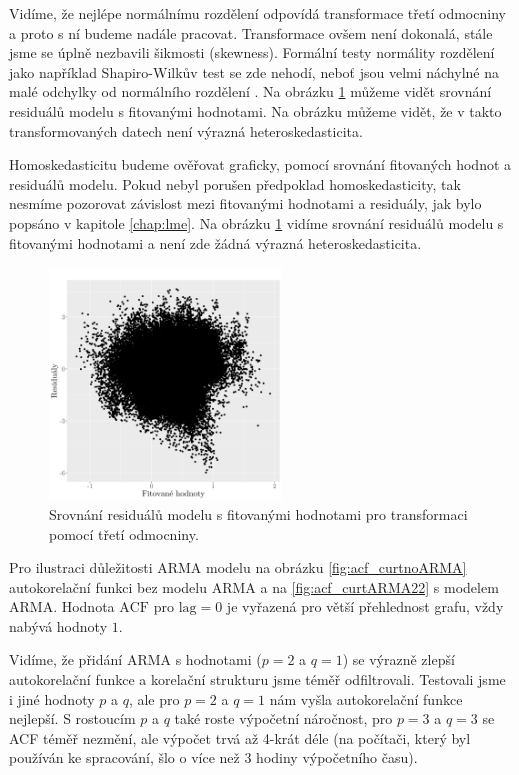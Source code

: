 Vidíme, že nejlépe normálnímu rozdělení odpovídá transformace třetí odmocniny a proto s ní budeme nadále pracovat. Transformace ovšem není dokonalá, stále jsme se úplně nezbavili šikmosti (skewness). Formální testy normálity rozdělení jako například Shapiro-Wilkův test se zde nehodí, neboť jsou velmi náchylné na malé odchylky od normálního rozdělení \parencite{shapirowilk}. Na obrázku \ref{fig:resvsfit_curt} můžeme vidět srovnání residuálů modelu s fitovanými hodnotami. Na obrázku můžeme vidět, že v takto transformovaných datech není výrazná heteroskedasticita.

Homoskedasticitu budeme ověřovat graficky, pomocí srovnání fitovaných hodnot a residuálů modelu. Pokud nebyl porušen předpoklad homoskedasticity, tak nesmíme pozorovat závislost mezi fitovanými hodnotami a residuály, jak bylo popsáno v kapitole \ref{chap:lme}. Na obrázku \ref{fig:resvsfit_curt} vidíme srovnání residuálů modelu s fitovanými hodnotami a není zde žádná výrazná heteroskedasticita.

\begin{figure}
	\centering
  \includegraphics[width=0.55\textwidth]{img/ch2/modmax15cm_curt.png}
	\caption{Srovnání residuálů modelu s fitovanými hodnotami pro transformaci pomocí třetí odmocniny.}
	\label{fig:resvsfit_curt}
\end{figure}

Pro ilustraci důležitosti ARMA modelu na obrázku \ref{fig:acf_curtnoARMA} autokorelační funkci bez modelu ARMA a na \ref{fig:acf_curtARMA22} s modelem ARMA. Hodnota $\text{ACF}$ pro $\text{lag}=0$ je vyřazená pro větší přehlednost grafu, vždy nabývá hodnoty $1$.

Vidíme, že přidání ARMA s hodnotami ($p=2$ a $q=1$) se výrazně zlepší autokorelační funkce a korelační strukturu jsme téměř odfiltrovali. Testovali jsme i jiné hodnoty $p$ a $q$, ale pro $p=2$ a $q=1$ nám vyšla autokorelační funkce nejlepší. S rostoucím $p$ a $q$ také roste výpočetní náročnost, pro $p=3$ a $q=3$ se ACF téměř nezmění, ale výpočet trvá až 4-krát déle (na počítači, který byl používán ke spracování, šlo o více než 3 hodiny výpočetního času).

